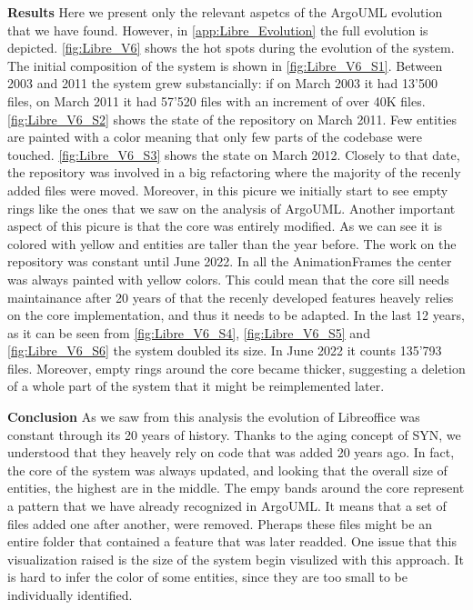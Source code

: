 \textbf{Results}
Here we present only the relevant aspetcs of the ArgoUML evolution that we have found. However, in \autoref{app:Libre_Evolution} the full evolution is depicted. \autoref{fig:Libre_V6} shows the hot spots during the evolution of the system. The initial composition of the system is shown in \autoref{fig:Libre_V6_S1}. Between 2003 and 2011 the system 
grew substancially: if on March 2003 it had 13'500 files, on March 2011 it had 57'520 files with an increment of over 40K files. \autoref{fig:Libre_V6_S2} shows the state of the repository on March 2011. Few entities are painted with a color meaning that only few parts of the codebase were touched. \autoref{fig:Libre_V6_S3} shows the state on March 2012. Closely to that date, the repository was involved in a big refactoring where the majority of the recenly added files were moved. Moreover, in this picure we initially start to see empty rings like the ones that we saw on the analysis of ArgoUML. Another important aspect of this picure is that the core was entirely modified. As we can see it is colored with yellow and entities are taller than the year before. The work on the repository was constant until June 2022. In all the AnimationFrames the center was always painted with yellow colors. This could mean that the core sill needs maintainance after 20 years of that the recenly developed features heavely relies on the core implementation, and thus it needs to be adapted. In the last 12 years, as it can be seen from \ref{fig:Libre_V6_S4}, \ref{fig:Libre_V6_S5} and \ref{fig:Libre_V6_S6} the system doubled its size. In June 2022 it counts 135'793 files. Moreover, empty rings around the core became thicker, suggesting a deletion of a whole part of the system that it might be reimplemented later.

\bigbreak
\textbf{Conclusion} As we saw from this analysis the evolution of Libreoffice was constant through its 20 years of history. 
Thanks to the aging concept of SYN, we understood that they heavely rely on code that was added 20 years ago. In fact, the core of the system was always updated, and looking that the overall size of entities, the highest are in the middle. The empy bands around the core represent a pattern that we have already recognized in ArgoUML. It means that a set of files added one after another, were removed. Pheraps these files might be an entire folder that contained a feature that was later readded. One issue that this visualization raised is the size of the system begin visulized with this approach. It is hard to infer the color of some entities, since they are too small to be individually identified. 

